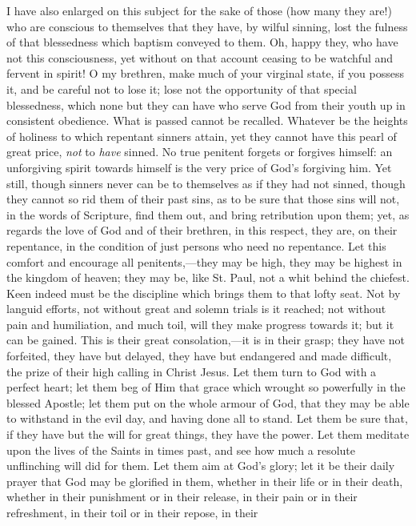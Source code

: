 I have also enlarged on this subject for the sake of those (how
many they are!) who are conscious to themselves that they have, by
wilful sinning, lost the fulness of that blessedness which baptism
conveyed to them. Oh, happy they, who have not this consciousness, yet
without on that account ceasing to be watchful and fervent in spirit!
O my brethren, make much of your virginal state, if you possess it,
and be careful not to lose it; lose not the opportunity of that
special blessedness, which none but they can have who serve God from
their youth up in consistent obedience. What is passed cannot be
recalled. Whatever be the heights of holiness to which repentant
sinners attain, yet they cannot have this pearl of great price, \emph{not}
to \emph{have} sinned. No true penitent forgets or forgives himself:
an unforgiving spirit towards himself is the very price of God's
forgiving him. Yet still, though sinners never can be to themselves as
if they had not sinned, though they cannot so rid them of their past
sins, as to be sure that those sins will not, in the words of
Scripture, find them out, and bring retribution upon them; yet, as
regards the love of God and of their brethren, in this respect, they
are, on their repentance, in the condition of just persons who need no
repentance. Let this comfort and encourage all penitents,—they may
be high, they may be highest in the kingdom of heaven; they may be,
like St. Paul, not a whit behind the chiefest. Keen indeed must be
the discipline which brings them to that lofty seat. Not by languid
efforts, not without great and solemn trials is it reached; not
without pain and humiliation, and much toil, will they make progress
towards it; but it can be gained. This is their great consolation,—it
is in their grasp; they have not forfeited, they have but delayed,
they have but endangered and made difficult, the prize of their high
calling in Christ Jesus. Let them turn to God with a perfect heart;
let them beg of Him that grace which wrought so powerfully in the
blessed Apostle; let them put on the whole armour of God, that they
may be able to withstand in the evil day, and having done all to
stand. Let them be sure that, if they have but the will for great
things, they have the power. Let them meditate upon the lives of the
Saints in times past, and see how much a resolute unflinching will did
for them. Let them aim at God's glory; let it be their daily prayer
that God may be glorified in them, whether in their life or in their
death, whether in their punishment or in their release, in their pain
or in their refreshment, in their toil or in their repose, in their
